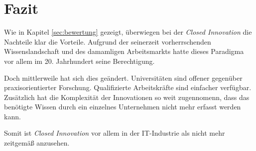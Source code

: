 \section{Fazit}\label{sec:fazit}
Wie in Kapitel \ref{sec:bewertung} gezeigt, überwiegen bei der \textit{Closed Innovation}
die Nachteile klar die Vorteile.
Aufgrund der seinerzeit vorherrschenden Wissenslandschaft und des damamligen Arbeitsmarkts
hatte dieses Paradigma vor allem im 20. Jahrhundert seine Berechtigung.

Doch mittlerweile hat sich dies geändert.
Universitäten sind offener gegenüber praxisorientierter Forschung.
Qualifizierte Arbeitskräfte sind einfacher verfügbar.
Zusätzlich hat die Komplexität der Innovationen so weit zugennomenn,
dass das benötigte Wissen durch ein einzelnes Unternehmen nicht mehr erfasst werden kann.

Somit ist \textit{Closed Innovation} vor allem in der IT-Industrie als nicht mehr zeitgemäß anzusehen.